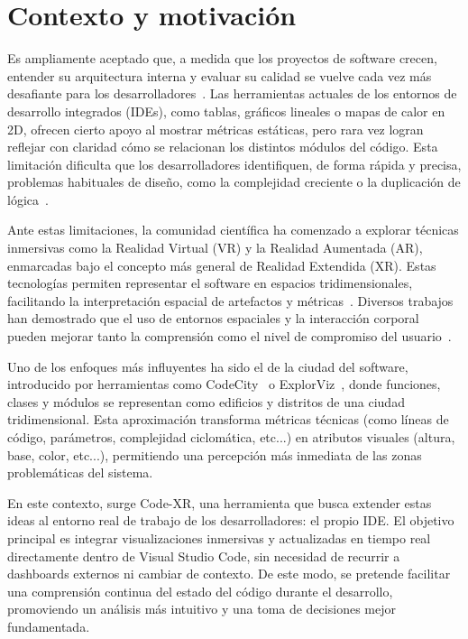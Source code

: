 \documentclass[a4paper, 12pt]{book}
\begin{document}
\section{Contexto y motivación}
\label{sec:contexto}

Es ampliamente aceptado que, a medida que los proyectos de software crecen, entender su arquitectura interna y evaluar su calidad se vuelve cada vez más desafiante para los desarrolladores~\cite{koschke2003software}. Las herramientas actuales de los entornos de desarrollo integrados (IDEs), como tablas, gráficos lineales o mapas de calor en 2D, ofrecen cierto apoyo al mostrar métricas estáticas, pero rara vez logran reflejar con claridad cómo se relacionan los distintos módulos del código. Esta limitación dificulta que los desarrolladores identifiquen, de forma rápida y precisa, problemas habituales de diseño, como la complejidad creciente o la duplicación de lógica~\cite{ball1996software,meyer2008seven}.

Ante estas limitaciones, la comunidad científica ha comenzado a explorar técnicas inmersivas como la Realidad Virtual (VR) y la Realidad Aumentada (AR), enmarcadas bajo el concepto más general de Realidad Extendida (XR). Estas tecnologías permiten representar el software en espacios tridimensionales, facilitando la interpretación espacial de artefactos y métricas~\cite{demiralp2006cave}. Diversos trabajos han demostrado que el uso de entornos espaciales y la interacción corporal pueden mejorar tanto la comprensión como el nivel de compromiso del usuario~\cite{batch2019there}.

Uno de los enfoques más influyentes ha sido el de la ciudad del software, introducido por herramientas como CodeCity~\cite{wettel2007visualizing} o ExplorViz~\cite{fittkau2015exploring}, donde funciones, clases y módulos se representan como edificios y distritos de una ciudad tridimensional. Esta aproximación transforma métricas técnicas (como líneas de código, parámetros, complejidad ciclomática, etc...) en atributos visuales (altura, base, color, etc...), permitiendo una percepción más inmediata de las zonas problemáticas del sistema.

En este contexto, surge Code-XR, una herramienta que busca extender estas ideas al entorno real de trabajo de los desarrolladores: el propio IDE. El objetivo principal es integrar visualizaciones inmersivas y actualizadas en tiempo real directamente dentro de Visual Studio Code, sin necesidad de recurrir a dashboards externos ni cambiar de contexto. De este modo, se pretende facilitar una comprensión continua del estado del código durante el desarrollo, promoviendo un análisis más intuitivo y una toma de decisiones mejor fundamentada.
\end{document}
